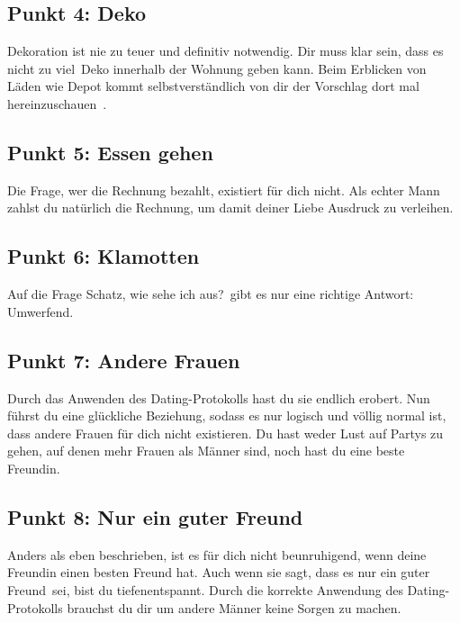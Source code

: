 \subsection{Punkt 4: Deko}
Dekoration ist nie zu teuer und definitiv notwendig. Dir muss klar sein, dass es nicht \glqq zu viel\grqq~Deko innerhalb der Wohnung geben kann. Beim Erblicken von Läden wie Depot kommt selbstverständlich von dir der Vorschlag dort \glqq mal hereinzuschauen~\grqq.

\subsection{Punkt 5: Essen gehen}
Die Frage, wer die Rechnung bezahlt, existiert für dich nicht. Als echter Mann zahlst du natürlich die Rechnung, um damit deiner Liebe Ausdruck zu verleihen. 

\subsection{Punkt 6: Klamotten}
Auf die Frage \glqq Schatz, wie sehe ich aus?\grqq~gibt es nur eine richtige Antwort: Umwerfend. 

\subsection{Punkt 7: Andere Frauen}
Durch das Anwenden des Dating-Protokolls hast du sie endlich erobert. Nun führst du eine glückliche Beziehung, sodass es nur logisch und völlig normal ist, dass andere Frauen für dich nicht existieren. Du hast weder Lust auf Partys zu gehen, auf denen mehr Frauen als Männer sind, noch hast du eine beste Freundin.

\subsection{Punkt 8: Nur ein guter Freund}
Anders als eben beschrieben, ist es für dich nicht beunruhigend, wenn deine Freundin einen besten Freund hat. Auch wenn sie sagt, dass es \glqq nur ein guter Freund\grqq~sei, bist du tiefenentspannt. 
Durch die korrekte Anwendung des Dating-Protokolls brauchst du dir um andere Männer keine Sorgen zu machen.

